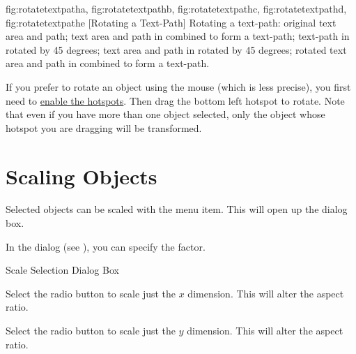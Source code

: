 {
 {fig:rotatetextpatha}{}{},
 {fig:rotatetextpathb}{}{},
 {fig:rotatetextpathc}{}{},
 {fig:rotatetextpathd}{}{},
 {fig:rotatetextpathe}{}{}
}
[Rotating a Text-Path]
{Rotating a text-path: 
 original text area and path; 
 text area and path in
 combined to form a text-path;
 text-path in
 rotated by 45 degrees;
 text area and path in
 rotated by 45 degrees;
 rotated text area and
path in  combined to form a text-path.}

If you prefer to rotate an \gls{object} using the mouse (which is
less precise), you first need to \hyperref[mi:hotspots]{enable the hotspots}.
Then drag the bottom left hotspot to rotate. Note that even if you
have more than one object selected, only the object whose hotspot you
are dragging will be transformed.



\section{Scaling Objects}\label{sec:scaleobjects}


Selected \glspl{object} can be scaled with the
 menu item. This will open up the
 dialog box.


In the  dialog (see ), you can specify the
 factor.

{}
{Scale Selection Dialog Box}


Select the  radio button to scale just the
$x$ dimension. This will alter the aspect ratio.


Select the  radio button to scale just the
$y$ dimension. This will alter the aspect ratio.

